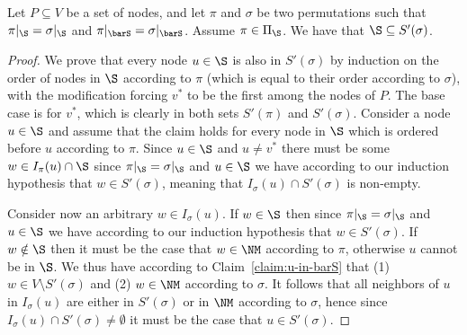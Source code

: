 \begin{claim}
\label{claim:sigma-pi}
Let $P \subseteq V$ be a set of nodes, and let $\pi$ and $\sigma$ be two permutations such that $\pi|_{\S}=\sigma|_{\S}$ and $\pi|_{\barS}=\sigma|_{\barS}$. Assume $\pi \in \Pi_\S$. We have that $\S \subseteq S'(\sigma)$.
\end{claim}
\begin{proof}
We prove that every node $u \in \S$ is also in $S'(\sigma)$ by induction on the order of nodes in $\S$ according to $\pi$ (which is equal to their order according to $\sigma$), with the modification forcing $v^*$ to be the first among the nodes of $P$.
The base case is for $v^*$, which is clearly in both sets $S'(\pi)$ and $S'(\sigma)$.
Consider a node $u \in \S$ and assume that the claim holds for every node in $\S$ which is ordered before $u$ according to $\pi$.
Since $u \in \S$ and $u \neq v^*$ there must be some $w \in I_\pi(u) \cap \S$ since $\pi|_{\S}=\sigma|_{\S}$ and $u \in \S$ we have according to our induction hypothesis that $w \in S'(\sigma)$, meaning that $I_\sigma(u) \cap S'(\sigma)$ is non-empty.

Consider now an arbitrary $w \in I_\sigma(u)$. If $w \in \S$ then since $\pi|_{\S}=\sigma|_{\S}$ and $u \in \S$ we have according to our induction hypothesis that $w \in S'(\sigma)$. If $w \notin \S$ then it must be the case that $w \in \NM$ according to $\pi$, otherwise $u$ cannot be in $\S$. We thus have according to Claim~\ref{claim:u-in-barS} that (1) $w \in V \setminus S'(\sigma)$ and (2) $w \in \NM$ according to $\sigma$. It follows that all neighbors of $u$ in $I_\sigma(u)$ are either in $S'(\sigma)$ or in $\NM$ according to $\sigma$, hence since $I_\sigma(u) \cap S'(\sigma) \neq \emptyset$ it must be the case that $u \in S'(\sigma)$.
\end{proof}






